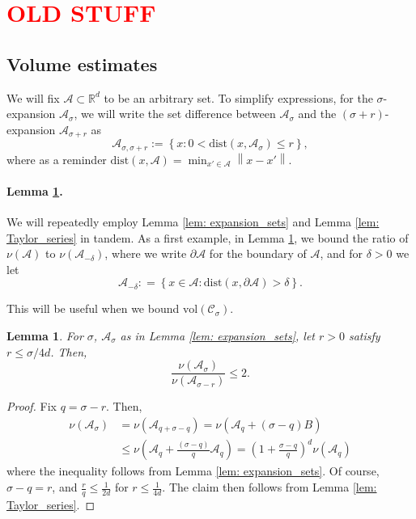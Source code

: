 \documentclass{article}
\newcommand{\set}[1]{\left\{#1\right\}}
\newcommand{\vol}{\mathrm{vol}}
\newcommand{\Reals}{\mathbb{R}}
\newcommand{\Rd}{\Reals^d}
\newcommand{\norm}[1]{\left\lVert#1\right\rVert}
\newcommand{\1}{\mathbf{1}}
\newcommand{\dist}{\mathrm{dist}}
\newcommand{\Cset}{\mathcal{C}}
\newcommand{\Aset}{\mathcal{A}}
\newcommand{\Asig}{\Aset_{\sigma}}
\newcommand{\Csig}{\Cset_{\sigma}}
\newcommand{\Asigr}{\Aset_{\sigma,\sigma + r}}
\theoremstyle{aldenthm}
\newtheorem{lemma}{Lemma}
\begin{document}
\section{\textcolor{red}{OLD STUFF}}

\subsection{Volume estimates}
We will fix $\Aset \subset \Rd$ to be an arbitrary set. To simplify expressions, for the $\sigma$-expansion $\Asig$, we will write the set difference between $\Asig$ and the $(\sigma + r)$-expansion $\Aset_{\sigma + r}$ as 
\begin{equation*}
\Asigr := \set{x: 0 < \dist(x, \Asig) \leq r},
\end{equation*}
where as a reminder $\dist(x, \Aset) = \min_{x' \in \Aset} \norm{x - x'}$.

\paragraph{Lemma \ref{lem: interior_of_expansion_sets}.}

We will repeatedly employ Lemma \ref{lem: expansion_sets} and Lemma \ref{lem: Taylor_series} in tandem. As a first example, in Lemma \ref{lem: interior_of_expansion_sets}, we bound the ratio of $\nu(\Aset)$ to $\nu(\Aset_{-\delta})$, where we write $\partial \Aset$ for the boundary of $\Aset$, and for $\delta > 0$ we let
\begin{equation*}
\Aset_{-\delta} : = \set{x \in \Aset: \dist(x, \partial \Aset) > \delta}.
\end{equation*}

This will be useful when we bound $\vol(\Csig)$.

\begin{lemma}
	\label{lem: interior_of_expansion_sets}
	For $\sigma$, $\Asig$ as in Lemma \ref{lem: expansion_sets}, let $r > 0$ satisfy $r \leq \sigma/4d$. Then,
	\begin{equation*}
	\frac{\nu(\Asig)}{\nu(\Aset_{\sigma - r})} \leq 2.
	\end{equation*}
\end{lemma}
\begin{proof}
	Fix $q = \sigma - r$. Then,
	\begin{align*}
	\nu(\Asig) & = \nu(\Aset_{q + \sigma - q}) = \nu(\Aset_q + (\sigma - q)B ) \\
	& \leq \nu(\Aset_q + \frac{(\sigma - q)}{q} \Aset_q) = \left(1 + \frac{\sigma - q}{q}\right)^d \nu(\Aset_q)
	\end{align*}
	where the inequality follows from Lemma \ref{lem: expansion_sets}. Of course, $\sigma - q = r$, and $\frac{r}{q} \leq \frac{1}{2d}$ for $r \leq \frac{1}{4d}$. The claim then follows from Lemma \ref{lem: Taylor_series}.
\end{proof}
\end{document}
